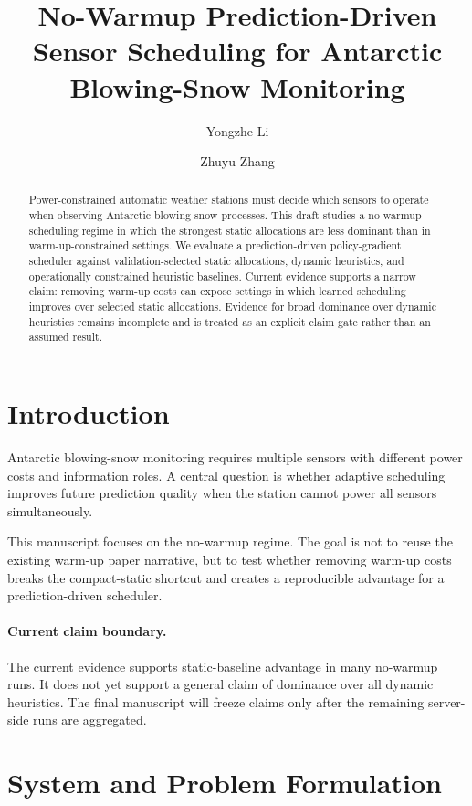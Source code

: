 \documentclass[11pt]{article}
\title{No-Warmup Prediction-Driven Sensor Scheduling for Antarctic Blowing-Snow Monitoring}
\author{Yongzhe Li \and Zhuyu Zhang}
\date{}
\begin{document}
\maketitle

\begin{abstract}
Power-constrained automatic weather stations must decide which sensors to
operate when observing Antarctic blowing-snow processes. This draft studies a
no-warmup scheduling regime in which the strongest static allocations are less
dominant than in warm-up-constrained settings. We evaluate a prediction-driven
policy-gradient scheduler against validation-selected static allocations,
dynamic heuristics, and operationally constrained heuristic baselines. Current
evidence supports a narrow claim: removing warm-up costs can expose settings in
which learned scheduling improves over selected static allocations. Evidence
for broad dominance over dynamic heuristics remains incomplete and is treated
as an explicit claim gate rather than an assumed result.
\end{abstract}

\section{Introduction}

Antarctic blowing-snow monitoring requires multiple sensors with different
power costs and information roles. A central question is whether adaptive
scheduling improves future prediction quality when the station cannot power all
sensors simultaneously.

This manuscript focuses on the no-warmup regime. The goal is not to reuse the
existing warm-up paper narrative, but to test whether removing warm-up costs
breaks the compact-static shortcut and creates a reproducible advantage for a
prediction-driven scheduler.

\paragraph{Current claim boundary.}
The current evidence supports static-baseline advantage in many no-warmup
runs. It does not yet support a general claim of dominance over all dynamic
heuristics. The final manuscript will freeze claims only after the remaining
server-side runs are aggregated.

\section{System and Problem Formulation}
\end{document}
